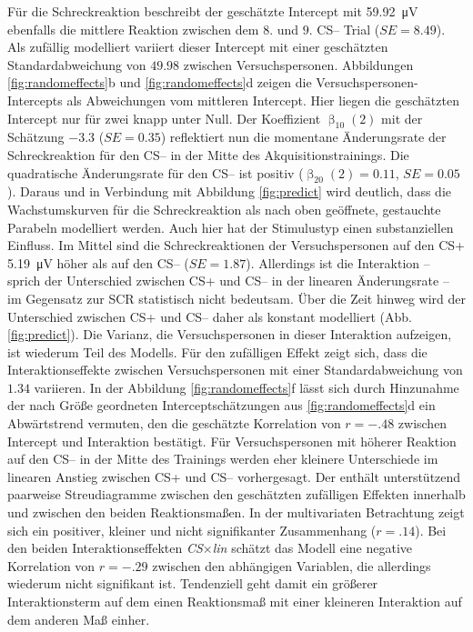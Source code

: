 		Für die Schreckreaktion beschreibt der geschätzte Intercept mit \SI{59.92}{\micro\volt} ebenfalls die mittlere Reaktion zwischen dem $8.$ und $9.$ CS-- Trial ($SE=8.49$). Als zufällig modelliert variiert dieser Intercept mit einer geschätzten Standardabweichung von $49.98$ zwischen Versuchspersonen. Abbildungen \ref{fig:randomeffects}b und \ref{fig:randomeffects}d zeigen die Versuchspersonen-Intercepts als Abweichungen vom mittleren Intercept. Hier liegen die geschätzten Intercept nur für zwei knapp unter Null.
		Der Koeffizient $\upbeta_{10}{}{(2)}$ mit der Schätzung $-3.3$ ($SE=0.35$) reflektiert nun die momentane Änderungsrate der Schreckreaktion für den CS-- in der Mitte des Akquisitionstrainings. Die quadratische Änderungsrate für den CS-- ist positiv ($\upbeta_{20}{}{(2)}=0.11$, $SE=0.05$). Daraus und in Verbindung mit Abbildung \ref{fig:predict} wird deutlich, dass die Wachstumskurven für die Schreckreaktion als nach oben geöffnete, gestauchte Parabeln modelliert werden. 
		Auch hier hat der Stimulustyp einen substanziellen Einfluss. Im Mittel sind die Schreckreaktionen der Versuchspersonen auf den CS+ \SI{5.19}{\micro\volt} höher als auf den CS-- ($SE=1.87$). Allerdings ist die Interaktion -- sprich der Unterschied zwischen CS+ und CS-- in der linearen Änderungsrate -- im Gegensatz zur SCR statistisch nicht bedeutsam. Über die Zeit hinweg wird der Unterschied zwischen CS+ und CS-- daher als konstant modelliert (Abb. \ref{fig:predict}).
		Die Varianz, die Versuchspersonen in dieser Interaktion aufzeigen, ist wiederum Teil des Modells. Für den zufälligen Effekt zeigt sich, dass die Interaktionseffekte zwischen Versuchspersonen mit einer Standardabweichung von $1.34$ variieren.
		In der Abbildung \ref{fig:randomeffects}f lässt sich durch Hinzunahme der nach Größe geordneten Interceptschätzungen aus \ref{fig:randomeffects}d ein Abwärtstrend vermuten, den die geschätzte Korrelation von $r=-.48$ zwischen Intercept und Interaktion bestätigt. Für Versuchspersonen mit höherer Reaktion auf den CS-- in der Mitte des Trainings werden eher kleinere Unterschiede im linearen Anstieg zwischen CS+ und CS-- vorhergesagt. Der  enthält unterstützend paarweise Streudiagramme zwischen den geschätzten zufälligen Effekten innerhalb und zwischen den beiden Reaktionsmaßen.
		In der multivariaten Betrachtung zeigt sich ein positiver, kleiner und nicht signifikanter Zusammenhang ($r=.14$). %
		Bei den beiden Interaktionseffekten \textit{CS$\times$lin} schätzt das Modell eine negative Korrelation von $r=-.29$ zwischen den abhängigen Variablen, die allerdings wiederum nicht signifikant ist. Tendenziell geht damit ein größerer Interaktionsterm auf dem einen Reaktionsmaß mit einer kleineren Interaktion auf dem anderen Maß einher.
	
